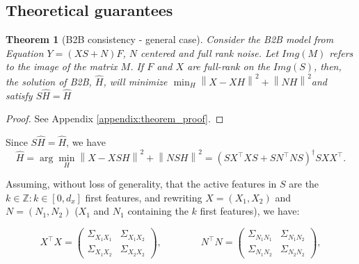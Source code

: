 \documentclass[preprint,12pt,3p]{elsarticle}
\newtheorem{theorem}{Theorem}
\begin{document}
\subsection{Theoretical guarantees}
\label{sec:theorem}

\begin{theorem}[B2B consistency - general case]

     Consider the B2B model from Equation $Y = (XS + N)F$, $N$ centered and full
     rank noise.
     Let $Img(M)$ refers to the image of the matrix $M$. If $F$ and $X$ are
     full-rank on the $Img(S)$, then, the solution of B2B, $\hat H$, will
     minimize
     $\min_H  \left \| X - XH\right\| ^2  + \left \| NH\right \| ^2$and satisfy $S\hat H = \hat H$
\end{theorem}
%
\begin{proof}
  See Appendix \ref{appendix:theorem_proof}.
\end{proof}

Since  $S\hat H = \hat H$, we have
\begin{equation}
  \hat H = \arg \min_H  \left \| X - XSH\right\| ^2  + \left \| NSH\right \| ^2 = (S X^\top XS +SN^\top NS) ^\dagger SXX^\top.
\end{equation}

Assuming, without loss of generality, that the active features in $S$ are the $k
\in \mathbb{Z}: k \in [0, d_x]$ first features, and rewriting $X=(X_1,X_2)$ and
$N=(N_1,N_2)$ ($X_1$ and $N_1$ containing the $k$ first features), we have:

\begin{equation}
  X^\top X = \left(\begin{array}{lccl}\Sigma_{X_1 X_1} & \Sigma_{X_1 X_2} \\ \Sigma_{X_1 X_2} & \Sigma_{X_2 X_2}\end{array}\right),\qquad\qquad N^\top N = \left(\begin{array}{lccl}\Sigma_{N_1 N_1} & \Sigma_{N_1 N_2} \\ \Sigma_{N_1 N_2} & \Sigma_{N_2 N_2}\end{array}\right),
\end{equation}
\end{document}
